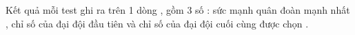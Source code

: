 Kết quả mỗi test ghi ra trên 1 dòng , gồm 3 số : sức mạnh quân đoàn mạnh nhất , chỉ số của đại đội đầu tiên và chỉ số của đại đội cuối cùng được chọn .